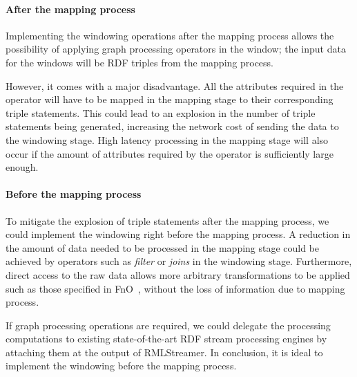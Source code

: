 \paragraph{After the mapping process}%
Implementing the windowing operations after the mapping process allows the 
possibility of applying graph processing operators in the window; the input data for 
the windows will be RDF triples from the mapping process. 

However, it comes with a major disadvantage. All the attributes required in the operator 
will have to be mapped in the mapping stage to their corresponding triple statements. 
This could lead to an explosion in the number of triple statements being generated, increasing 
the network cost of sending the data to the windowing stage. High latency processing in 
the mapping stage will also occur if the amount of attributes required by 
the operator is sufficiently large enough. 


\paragraph{Before the mapping process}%
\label{par:Before the mapping process}
To mitigate the explosion of triple statements after the mapping process, we could implement 
the windowing right before the mapping process. A reduction in the amount of 
data needed to be processed in the mapping stage could be achieved by operators 
such as \emph{filter} or \emph{joins} in the windowing stage. Furthermore, direct 
access to the raw data allows more arbitrary transformations to be applied such as 
those specified in FnO~\cite{fno_ben}, without the loss of 
information due to mapping process. 

If graph processing operations are required, we could delegate the processing computations to 
existing state-of-the-art RDF stream processing engines by attaching them at the output of 
RMLStreamer. In conclusion, it is ideal to implement the windowing before the mapping process. 


